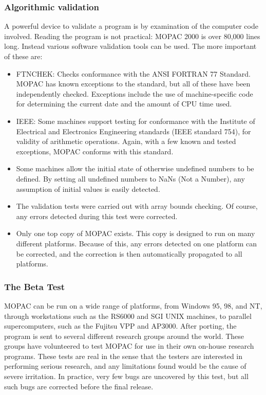 \subsubsection*{Algorithmic validation}
A powerful device to validate a program is by examination of the
computer code involved.  Reading the program is not practical:
MOPAC 2000 is over 80,000 lines long. Instead various software
validation tools can be used.  The more important of these are:
\begin{itemize}
\item FTNCHEK:  Checks conformance with the ANSI FORTRAN 77 Standard.
MOPAC has known exceptions to the standard, but all of these have been
independently checked.  Exceptions include the use of machine-specific
code for determining the current date and the amount of CPU time used.

\item IEEE: Some machines support testing for conformance with the Institute of
Electrical and Electronics Engineering standards (IEEE standard 754), for
validity of arithmetic operations.  Again, with a few known and tested
exceptions, MOPAC conforms with this standard.

\item Some machines allow the initial state of otherwise undefined numbers to be
defined.  By setting all undefined numbers to NaNs (Not a Number), any
assumption of initial values is easily detected.

\item The validation tests were carried out with array bounds checking.  Of
course, any errors detected during this test were corrected.

\item Only one top copy of MOPAC exists.  This copy is designed to run on
many different platforms.  Because of this, any errors detected on one
platform can be corrected, and the correction is then automatically
propagated to all platforms.
\end{itemize}

\subsubsection*{The Beta Test}

MOPAC can be run on a wide range of platforms, from Windows 95, 98, and  NT,
through workstations such as the RS6000 and SGI UNIX machines, to  parallel
supercomputers, such as the Fujitsu VPP and AP3000.  After porting,  the
program is sent to several different research groups around the world.  These
groups have volunteered to test MOPAC for use in their own on-house research
programs.  These tests are real in the sense that the testers are interested
in  performing serious research, and any limitations found would be the cause
of  severe irritation.  In practice, very few bugs are uncovered by this test,
but all  such bugs are corrected before the final release.

